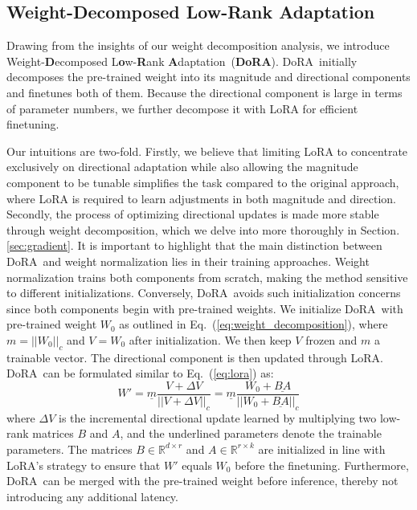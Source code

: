 \documentclass{article}
\newcommand{\oursfullbold}{Weight-\textbf{D}ecomposed L\textbf{o}w-\textbf{R}ank \textbf{A}daptation}
\newcommand{\ours}{DoRA}
\theoremstyle{plain}
\theoremstyle{definition}
\theoremstyle{remark}
\begin{document}
\subsection{\oursfullbold}
\label{sec:MADoRA_method}
Drawing from the insights of our weight decomposition analysis, we introduce \oursfullbold~(\textbf{\ours}). \ours~initially decomposes the pre-trained weight into its magnitude and directional components and finetunes both of them. Because the directional component is large in terms of parameter numbers, we further decompose it with LoRA for efficient finetuning. 

Our intuitions are two-fold. Firstly, we believe that limiting LoRA to concentrate exclusively on directional adaptation while also allowing the magnitude component to be tunable simplifies the task compared to the original approach, where LoRA is required to learn adjustments in both magnitude and direction. Secondly, the process of optimizing directional updates is made more stable through weight decomposition, which we delve into more thoroughly in Section.\ref{sec:gradient}. It is important to highlight that the main distinction between \ours~and weight normalization \cite{salimans2016weight} lies in their training approaches. Weight normalization trains both components from scratch, making the method sensitive to different initializations. Conversely, \ours~avoids such initialization concerns since both components begin with pre-trained weights. We initialize \ours~with pre-trained weight $W_0$ as outlined in Eq.~(\ref{eq:weight_decomposition}), where $m = ||W_0||_{c}$ and $V = W_0$ after initialization. We then keep $V$ frozen and $m$ a trainable vector. The directional component is then updated through LoRA. 
\ours~can be formulated similar to Eq.~(\ref{eq:lora}) as: 
\begin{equation}
W'= \underline{m}\frac{V+\Delta V}{||V+\Delta V||_{c}} = \underline{m}\frac{W_0+\underline{BA}}{||W_0+\underline{BA}||_{c}}
\label{eq:MADoRA}
\end{equation}
where $\Delta V$ is the incremental directional update learned by multiplying two low-rank matrices $B$ and $A$, and the underlined parameters denote the trainable parameters. The matrices $B\in \mathbb{R}^{d \times r}$ and $A\in \mathbb{R}^{r \times k}$ are initialized in line with LoRA's strategy to ensure that $W'$ equals $W_0$ before the finetuning. Furthermore, \ours~can be merged with the pre-trained weight before inference, thereby not introducing any additional latency. 
\end{document}
